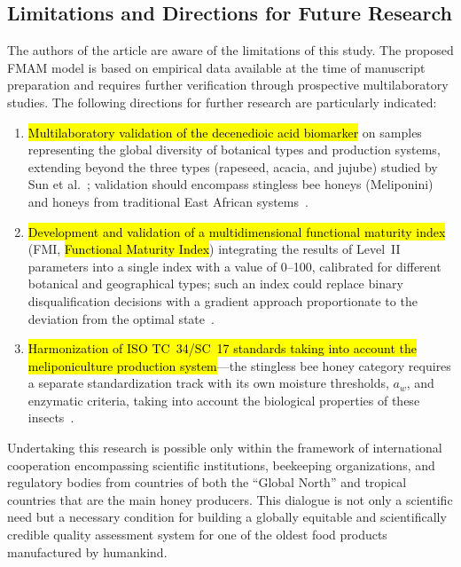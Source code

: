 \documentclass[foods,review,accept,pdftex,moreauthors]{Definitions/mdpi}
\begin{document}
{\subsection{Limitations and Directions for Future Research}


The authors of the article are aware of the limitations of this
study. The proposed FMAM model is based on empirical data available
at the time of manuscript preparation and requires further
verification through prospective multilaboratory studies.
The following directions for further research are particularly
indicated:

\begin{enumerate}
    \item {\hl{Multilaboratory validation of the decenedioic
          acid biomarker}} on samples representing the global
          diversity of botanical types and production systems,
          extending beyond the three types (rapeseed, acacia,
          and jujube) studied by Sun et al.~\cite{sun2021}; validation
          should encompass stingless bee honeys (Meliponini)
          and honeys from traditional East African
          systems~\cite{tadele2025}.

    \item {\hl{Development and validation of a multidimensional
          functional maturity index}} (FMI,
          {\hl{Functional Maturity Index}}) integrating the
          results of Level~II parameters into a single index
          with a value of 0--100, calibrated for different
          botanical and geographical types; such an index could
          replace binary disqualification decisions with a
          gradient approach proportionate to the deviation from
          the optimal state~\cite{zhang2021,guo2020,sun2021}.

    \item {\hl{Harmonization of ISO TC~34/SC~17 standards
          taking into account the meliponiculture production
          system}}---the stingless bee honey category requires
          a separate standardization track with its own moisture
          thresholds, $a_w$, and enzymatic criteria, taking
          into account the biological properties of these
          insects~\cite{stinglessyeastbrazil2021,stinglesswjava2024}.
\end{enumerate}

Undertaking this research is possible only within the framework
of international cooperation encompassing scientific institutions,
beekeeping organizations, and regulatory bodies from countries of
both the ``Global North'' and tropical countries that are the
main honey producers. This dialogue is not only a scientific need but a necessary condition for building a globally equitable and
scientifically credible quality assessment system for one of the
oldest food products manufactured by humankind.


}
\end{document}
